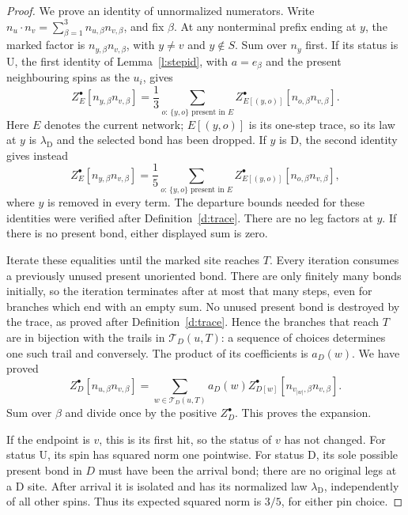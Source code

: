 \begin{proof}
We prove an identity of unnormalized numerators. Write
\(n_u\cdot n_v=\sum_{\beta=1}^3n_{u,\beta}n_{v,\beta}\), and fix
\(\beta\). At any nonterminal prefix ending at \(y\), the marked
factor is \(n_{y,\beta}n_{v,\beta}\), with \(y\ne v\) and
\(y\notin S\). Sum over \(n_y\) first.
If its status is \(\mathrm U\), the first identity of
Lemma~\ref{l:stepid}, with \(a=e_\beta\) and the present
neighbouring spins as the \(u_i\), gives
\[
 Z^\bullet_E[n_{y,\beta}n_{v,\beta}]
   =\frac13\sum_{o:\,\{y,o\}\text{ present in }E}
        Z^\bullet_{E[(y,o)]}[n_{o,\beta}n_{v,\beta}].
\]
Here \(E\) denotes the current network; \(E[(y,o)]\) is its
one-step trace, so its law at \(y\) is
\(\lambda_{\mathrm D}\) and the selected bond has been dropped.
If \(y\) is \(\mathrm D\), the second identity gives instead
\[
 Z^\bullet_E[n_{y,\beta}n_{v,\beta}]
   =\frac15\sum_{o:\,\{y,o\}\text{ present in }E}
        Z^\bullet_{E[(y,o)]}[n_{o,\beta}n_{v,\beta}],
\]
where \(y\) is removed in every term.
The departure bounds needed for these identities were verified
after Definition~\ref{d:trace}. There are no leg factors at \(y\).
If there is no present bond, either displayed sum is zero.

Iterate these equalities until the marked site reaches \(T\).
Every iteration consumes a previously unused present unoriented
bond. There are only finitely many bonds initially, so the
iteration terminates after at most that many steps, even for
branches which end with an empty sum. No unused present bond is
destroyed by the trace, as proved after
Definition~\ref{d:trace}. Hence the branches that reach \(T\) are
in bijection with the trails in \(\mathcal T_D(u,T)\): a sequence
of choices determines one such trail and conversely. The product of its
coefficients is \(a_D(w)\). We have proved
\[
 Z^\bullet_D[n_{u,\beta}n_{v,\beta}]
 =\sum_{w\in\mathcal T_D(u,T)}
       a_D(w)Z^\bullet_{D[w]}
                   [n_{v_{|w|},\beta}n_{v,\beta}].
\]
Sum over \(\beta\) and divide once by the positive \(Z^\bullet_D\).
This proves the expansion.

If the endpoint is \(v\), this is its first hit, so the status of
\(v\) has not changed. For status \(\mathrm U\), its spin has
squared norm one pointwise. For status \(\mathrm D\), its sole
possible present bond in \(D\) must have been the arrival bond;
there are no original legs at a \(\mathrm D\) site. After arrival
it is isolated and has its normalized law
\(\lambda_{\mathrm D}\), independently of all other spins.
Thus its expected squared norm is \(3/5\), for either pin choice.


\end{proof}
